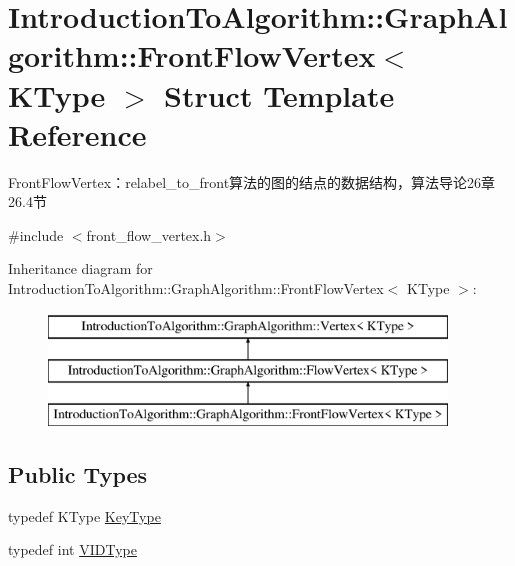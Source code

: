 \hypertarget{struct_introduction_to_algorithm_1_1_graph_algorithm_1_1_front_flow_vertex}{}\section{Introduction\+To\+Algorithm\+:\+:Graph\+Algorithm\+:\+:Front\+Flow\+Vertex$<$ K\+Type $>$ Struct Template Reference}
\label{struct_introduction_to_algorithm_1_1_graph_algorithm_1_1_front_flow_vertex}


Front\+Flow\+Vertex：relabel\+\_\+to\+\_\+front算法的图的结点的数据结构，算法导论26章26.4节  




{\ttfamily \#include $<$front\+\_\+flow\+\_\+vertex.\+h$>$}

Inheritance diagram for Introduction\+To\+Algorithm\+:\+:Graph\+Algorithm\+:\+:Front\+Flow\+Vertex$<$ K\+Type $>$\+:\begin{figure}[H]
\begin{center}
\leavevmode
\includegraphics[height=3.000000cm]{struct_introduction_to_algorithm_1_1_graph_algorithm_1_1_front_flow_vertex}
\end{center}
\end{figure}
\subsection*{Public Types}
\begin{DoxyCompactItemize}
\item 
typedef K\+Type \hyperlink{struct_introduction_to_algorithm_1_1_graph_algorithm_1_1_front_flow_vertex_a76ed9e9d0c0da5c60c4a004eeda192ad}{Key\+Type}
\item 
typedef int \hyperlink{struct_introduction_to_algorithm_1_1_graph_algorithm_1_1_front_flow_vertex_ab1973e8ed99c2e213532fabbee1a66b8}{V\+I\+D\+Type}
\end{DoxyCompactItemize}
